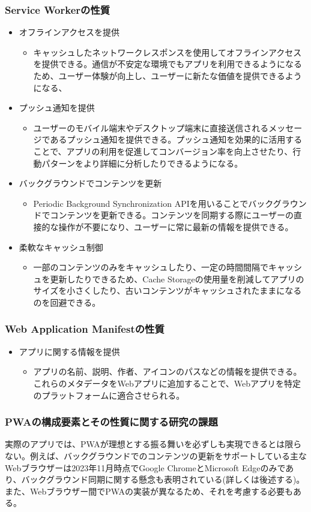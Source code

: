 \subsubsection{Service Workerの性質}\label{subsubsection:Service Workerの性質}
\begin{itemize}
    \item オフラインアクセスを提供
    \begin{itemize}
        \item キャッシュしたネットワークレスポンスを使用してオフラインアクセスを提供できる。通信が不安定な環境でもアプリを利用できるようになるため、ユーザー体験が向上し、ユーザーに新たな価値を提供できるようになる、
    \end{itemize}
    \item プッシュ通知を提供
    \begin{itemize}
        \item ユーザーのモバイル端末やデスクトップ端末に直接送信されるメッセージであるプッシュ通知を提供できる。プッシュ通知を効果的に活用することで、アプリの利用を促進してコンバージョン率を向上させたり、行動パターンをより詳細に分析したりできるようになる。
    \end{itemize}
    \item バックグラウンドでコンテンツを更新
    \begin{itemize}
        \item Periodic Background Synchronization APIを用いることでバックグラウンドでコンテンツを更新できる。コンテンツを同期する際にユーザーの直接的な操作が不要になり、ユーザーに常に最新の情報を提供できる。
    \end{itemize}
    \item 柔軟なキャッシュ制御
    \begin{itemize}
        \item 一部のコンテンツのみをキャッシュしたり、一定の時間間隔でキャッシュを更新したりできるため、Cache Storageの使用量を削減してアプリのサイズを小さくしたり、古いコンテンツがキャッシュされたままになるのを回避できる。
    \end{itemize}
\end{itemize}
\subsubsection{Web Application Manifestの性質}\label{subsubsection:Web Application Manifestの性質}
\begin{itemize}
    \item アプリに関する情報を提供
    \begin{itemize}
        \item アプリの名前、説明、作者、アイコンのパスなどの情報を提供できる。これらのメタデータをWebアプリに追加することで、Webアプリを特定のプラットフォームに適合させられる。
    \end{itemize}
\end{itemize}
\subsubsection{PWAの構成要素とその性質に関する研究の課題}
実際のアプリでは、PWAが理想とする振る舞いを必ずしも実現できるとは限らない。例えば、バックグラウンドでのコンテンツの更新をサポートしている主なWebブラウザーは2023年11月時点でGoogle ChromeとMicrosoft Edgeのみであり、バックグラウンド同期に関する懸念も表明されている(詳しくは後述する)。また、Webブラウザー間でPWAの実装が異なるため、それを考慮する必要もある。
